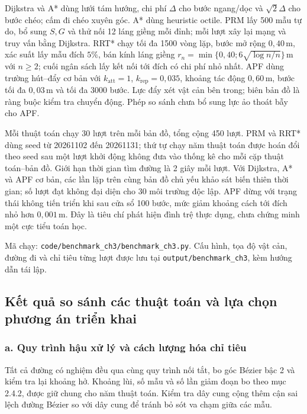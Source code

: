Dijkstra và A* dùng lưới tám hướng, chi phí \(\Delta\) cho bước ngang/dọc và \(\sqrt{2}\Delta\) cho bước chéo; cấm đi chéo xuyên góc. A* dùng heuristic octile. PRM lấy 500 mẫu tự do, bổ sung \(S,G\) và thử nối 12 láng giềng mỗi đỉnh; mỗi lượt xây lại mạng và truy vấn bằng Dijkstra. RRT* chạy tối đa 1500 vòng lặp, bước mở rộng \(0{,}40\,\mathrm{m}\), xác suất lấy mẫu đích \(5\%\), bán kính láng giềng \(r_n=\min\{0{,}40;6\sqrt{\log n/n}\}\,\mathrm{m}\) với \(n\geq2\); cuối ngân sách lấy kết nối tới đích có chi phí nhỏ nhất. APF dùng trường hút--đẩy cơ bản với \(k_{\mathrm{att}}=1\), \(k_{\mathrm{rep}}=0{,}035\), khoảng tác động \(0{,}60\,\mathrm{m}\), bước tối đa \(0{,}03\,\mathrm{m}\) và tối đa 3000 bước. Lực đẩy xét vật cản bên trong; biên bản đồ là ràng buộc kiểm tra chuyển động. Phép so sánh chưa bổ sung lực ảo thoát bẫy cho APF.

Mỗi thuật toán chạy 30 lượt trên mỗi bản đồ, tổng cộng 450 lượt. PRM và RRT* dùng seed từ 20261102 đến 20261131; thứ tự chạy năm thuật toán được hoán đổi theo seed sau một lượt khởi động không đưa vào thống kê cho mỗi cặp thuật toán--bản đồ. Giới hạn thời gian tìm đường là 2 giây mỗi lượt. Với Dijkstra, A* và APF cơ bản, các lần lặp trên cùng bản đồ chủ yếu khảo sát biến thiên thời gian; số lượt đạt không đại diện cho 30 môi trường độc lập. APF dừng với trạng thái không tiến triển khi sau cửa sổ 100 bước, mức giảm khoảng cách tới đích nhỏ hơn \(0{,}001\,\mathrm{m}\). Đây là tiêu chí phát hiện đình trệ thực dụng, chưa chứng minh một cực tiểu toán học.

Mã chạy: \texttt{code/benchmark\_ch3/benchmark\_ch3.py}. Cấu hình, tọa độ vật cản, đường đi và chỉ tiêu từng lượt được lưu tại \texttt{output/benchmark\_ch3}, kèm hướng dẫn tái lập.

\subsection{Kết quả so sánh các thuật toán và lựa chọn phương án triển khai}

\subsubsection*{a. Quy trình hậu xử lý và cách lượng hóa chỉ tiêu}

Tất cả đường có nghiệm đều qua cùng quy trình nối tắt, bo góc Bézier bậc 2 và kiểm tra lại khoảng hở. Khoảng lùi, số mẫu và số lần giảm đoạn bo theo mục 2.4.2, được giữ chung cho năm thuật toán. Kiểm tra dây cung cộng thêm cận sai lệch đường Bézier so với dây cung để tránh bỏ sót va chạm giữa các mẫu.

